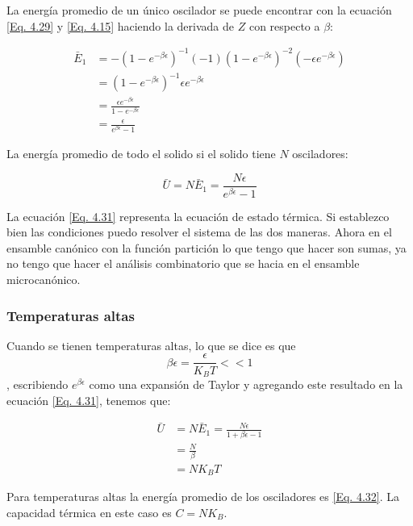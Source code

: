 \documentclass[11pt,fleqn]{book}
\begin{document}
La energía promedio de un único oscilador se puede encontrar con la ecuación \ref{Eq. 4.29} y \ref{Eq. 4.15} haciendo la derivada de $Z$ con respecto a $\beta$: 

\begin{equation}
\begin{split}
    \bar{E}_{1}&=-(1-e^{-\beta\epsilon})^{-1}(-1)(1-e^{-\beta\epsilon})^{-2}(-\epsilon e^{-\beta\epsilon})\\
    &=(1-e^{-\beta\epsilon})^{-1}\epsilon e^{-\beta\epsilon}\\
    &=\frac{\epsilon e^{-\beta\epsilon}}{1-e^{-\beta\epsilon}}\\
    &=\frac{\epsilon}{e^{\beta\epsilon}-1}
\end{split}
    \label{Eq. 4.30}
\end{equation}

La energía promedio de todo el solido si el solido tiene $N$ osciladores:

\begin{equation}
    \bar{U}=N\bar{E}_{1}=\frac{N\epsilon}{e^{\beta\epsilon}-1}
    \label{Eq. 4.31}
\end{equation}

La ecuación \ref{Eq. 4.31} representa la ecuación de estado térmica. Si establezco bien las condiciones puedo resolver el sistema de las dos maneras. Ahora en el ensamble canónico con la función partición lo que tengo que hacer son sumas, ya no tengo que hacer el análisis combinatorio que se hacia en el ensamble microcanónico.

\subsubsection{Temperaturas altas}

Cuando se tienen temperaturas altas, lo que se dice es que $$\beta\epsilon=\frac{\epsilon}{K_{B}T}<<1$$, escribiendo $e^{\beta\epsilon}$ como una expansión de Taylor y agregando este resultado en la ecuación \ref{Eq. 4.31}, tenemos que:

\begin{equation}
\begin{split}
    \bar{U}&=N\bar{E}_{1}=\frac{N\epsilon}{1+\beta\epsilon-1}\\
    &=\frac{N}{\beta}\\
    &=NK_{B}T
\end{split}
    \label{Eq. 4.32}
\end{equation}

Para temperaturas altas la energía promedio de los osciladores es \ref{Eq. 4.32}. La capacidad térmica en este caso es $C=NK_{B}$.
\end{document}
